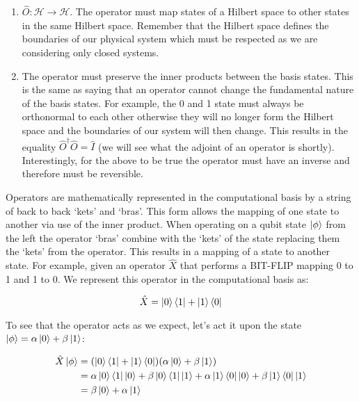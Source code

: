 \begin{enumerate}
  \item $\hat{O}:\mathcal{H}\rightarrow \mathcal{H}$. The operator must map states of a Hilbert space to other states in the same Hilbert space. Remember that the Hilbert space defines the boundaries of our physical system which must be respected as we are considering only closed systems. 
  \item The operator must preserve the inner   products between the basis states.
    This is the same as saying that an operator cannot change the fundamental nature of the basis states. For example, the 0 and 1 state must always be orthonormal to each other otherwise they will no longer form the Hilbert space and the boundaries of our system will then change. This results in the equality $\hat{O}^\dagger\hat{O}=\hat{I}$ (we will see what the adjoint of an operator is shortly). Interestingly, for the above to be true the operator must have an inverse and therefore must be reversible.
\end{enumerate}

Operators are mathematically represented in the computational basis by a string of back to back `kets' and `bras'. This form allows the mapping of one state to another via use of the inner product. When operating on a qubit state $\left\vert{\phi}\right\rangle$ from the left the operator `bras' combine with the `kets' of the state replacing them the `kets' from the operator. This results in a mapping of a state to another state. For example, given an operator $\hat{X}$ that performs a BIT-FLIP mapping 0 to 1 and 1 to 0. We represent this operator in the computational basis as:

\begin{equation}
    \hat{X}=\left\vert{0}\right\rangle\left\langle{1}\right\vert+\left\vert{1}\right\rangle\left\langle{0}\right\vert
\end{equation}

To see that the operator acts as we expect, let's act it upon the state $\left\vert{\phi}\right\rangle=\alpha\left\vert{0}\right\rangle + \beta\left\vert{1}\right\rangle$:

\begin{equation}
\begin{split}
      \hat{X}\left\vert{\phi}\right\rangle &= (\left\vert{0}\right\rangle\left\langle{1}\right\vert+\left\vert{1}\right\rangle\left\langle{0}\right\vert)(\alpha\left\vert{0}\right\rangle + \beta\left\vert{1}\right\rangle) \\
    &= \alpha\left\vert{0}\right\rangle\left\langle{1}\right\vert\left\vert{0}\right\rangle+\beta\left\vert{0}\right\rangle\left\langle{1}\right\vert\left\vert{1}\right\rangle+\alpha\left\vert{1}\right\rangle\left\langle{0}\right\vert\left\vert{0}\right\rangle+\beta\left\vert{1}\right\rangle\left\langle{0}\right\vert\left\vert{1}\right\rangle \\
    &= \beta\left\vert{0}\right\rangle+\alpha\left\vert{1}\right\rangle
\end{split}
\end{equation}

